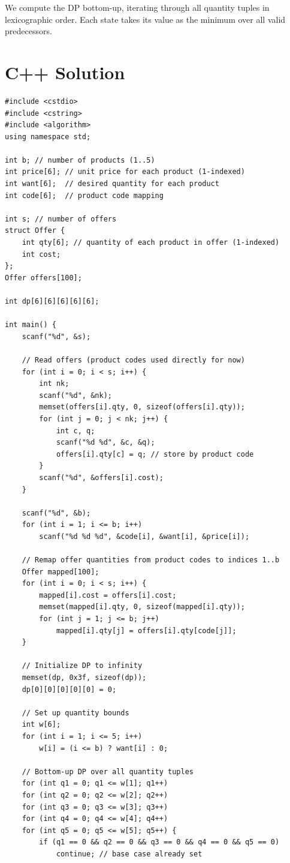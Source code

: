 \documentclass[11pt,a4paper]{article}
\begin{document}
We compute the DP bottom-up, iterating through all quantity tuples in lexicographic order.
Each state takes its value as the minimum over all valid predecessors.

\section{C++ Solution}

\begin{lstlisting}
#include <cstdio>
#include <cstring>
#include <algorithm>
using namespace std;

int b; // number of products (1..5)
int price[6]; // unit price for each product (1-indexed)
int want[6];  // desired quantity for each product
int code[6];  // product code mapping

int s; // number of offers
struct Offer {
    int qty[6]; // quantity of each product in offer (1-indexed)
    int cost;
};
Offer offers[100];

int dp[6][6][6][6][6];

int main() {
    scanf("%d", &s);

    // Read offers (product codes used directly for now)
    for (int i = 0; i < s; i++) {
        int nk;
        scanf("%d", &nk);
        memset(offers[i].qty, 0, sizeof(offers[i].qty));
        for (int j = 0; j < nk; j++) {
            int c, q;
            scanf("%d %d", &c, &q);
            offers[i].qty[c] = q; // store by product code
        }
        scanf("%d", &offers[i].cost);
    }

    scanf("%d", &b);
    for (int i = 1; i <= b; i++)
        scanf("%d %d %d", &code[i], &want[i], &price[i]);

    // Remap offer quantities from product codes to indices 1..b
    Offer mapped[100];
    for (int i = 0; i < s; i++) {
        mapped[i].cost = offers[i].cost;
        memset(mapped[i].qty, 0, sizeof(mapped[i].qty));
        for (int j = 1; j <= b; j++)
            mapped[i].qty[j] = offers[i].qty[code[j]];
    }

    // Initialize DP to infinity
    memset(dp, 0x3f, sizeof(dp));
    dp[0][0][0][0][0] = 0;

    // Set up quantity bounds
    int w[6];
    for (int i = 1; i <= 5; i++)
        w[i] = (i <= b) ? want[i] : 0;

    // Bottom-up DP over all quantity tuples
    for (int q1 = 0; q1 <= w[1]; q1++)
    for (int q2 = 0; q2 <= w[2]; q2++)
    for (int q3 = 0; q3 <= w[3]; q3++)
    for (int q4 = 0; q4 <= w[4]; q4++)
    for (int q5 = 0; q5 <= w[5]; q5++) {
        if (q1 == 0 && q2 == 0 && q3 == 0 && q4 == 0 && q5 == 0)
            continue; // base case already set


\end{lstlisting}
\end{document}
